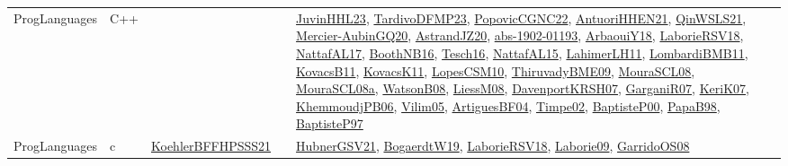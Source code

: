 {\begin{longtable}{lp{3cm}>{\raggedright}p{6cm}>{\raggedright}p{6cm}p{8cm}}
ProgLanguages &  C++  &  &  & \href{papers/JuvinHHL23.pdf}{JuvinHHL23}\cite{JuvinHHL23}, \href{papers/TardivoDFMP23.pdf}{TardivoDFMP23}\cite{TardivoDFMP23}, \href{papers/PopovicCGNC22.pdf}{PopovicCGNC22}\cite{PopovicCGNC22}, \href{papers/AntuoriHHEN21.pdf}{AntuoriHHEN21}\cite{AntuoriHHEN21}, \href{articles/QinWSLS21.pdf}{QinWSLS21}\cite{QinWSLS21}, \href{papers/Mercier-AubinGQ20.pdf}{Mercier-AubinGQ20}\cite{Mercier-AubinGQ20}, \href{articles/AstrandJZ20.pdf}{AstrandJZ20}\cite{AstrandJZ20}, \href{articles/abs-1902-01193.pdf}{abs-1902-01193}\cite{abs-1902-01193}, \href{papers/ArbaouiY18.pdf}{ArbaouiY18}\cite{ArbaouiY18}, \href{articles/LaborieRSV18.pdf}{LaborieRSV18}\cite{LaborieRSV18}, \href{articles/NattafAL17.pdf}{NattafAL17}\cite{NattafAL17}, \href{papers/BoothNB16.pdf}{BoothNB16}\cite{BoothNB16}, \href{papers/Tesch16.pdf}{Tesch16}\cite{Tesch16}, \href{articles/NattafAL15.pdf}{NattafAL15}\cite{NattafAL15}, \href{papers/LahimerLH11.pdf}{LahimerLH11}\cite{LahimerLH11}, \href{papers/LombardiBMB11.pdf}{LombardiBMB11}\cite{LombardiBMB11}, \href{articles/KovacsB11.pdf}{KovacsB11}\cite{KovacsB11}, \href{articles/KovacsK11.pdf}{KovacsK11}\cite{KovacsK11}, \href{articles/LopesCSM10.pdf}{LopesCSM10}\cite{LopesCSM10}, \href{papers/ThiruvadyBME09.pdf}{ThiruvadyBME09}\cite{ThiruvadyBME09}, \href{papers/MouraSCL08.pdf}{MouraSCL08}\cite{MouraSCL08}, \href{papers/MouraSCL08a.pdf}{MouraSCL08a}\cite{MouraSCL08a}, \href{papers/WatsonB08.pdf}{WatsonB08}\cite{WatsonB08}, \href{articles/LiessM08.pdf}{LiessM08}\cite{LiessM08}, \href{papers/DavenportKRSH07.pdf}{DavenportKRSH07}\cite{DavenportKRSH07}, \href{papers/GarganiR07.pdf}{GarganiR07}\cite{GarganiR07}, \href{papers/KeriK07.pdf}{KeriK07}\cite{KeriK07}, \href{papers/KhemmoudjPB06.pdf}{KhemmoudjPB06}\cite{KhemmoudjPB06}, \href{papers/Vilim05.pdf}{Vilim05}\cite{Vilim05}, \href{papers/ArtiguesBF04.pdf}{ArtiguesBF04}\cite{ArtiguesBF04}, \href{articles/Timpe02.pdf}{Timpe02}\cite{Timpe02}, \href{articles/BaptisteP00.pdf}{BaptisteP00}\cite{BaptisteP00}, \href{articles/PapaB98.pdf}{PapaB98}\cite{PapaB98}, \href{papers/BaptisteP97.pdf}{BaptisteP97}\cite{BaptisteP97}\\
ProgLanguages & c  & \href{articles/KoehlerBFFHPSSS21.pdf}{KoehlerBFFHPSSS21}\cite{KoehlerBFFHPSSS21} &  & \href{articles/HubnerGSV21.pdf}{HubnerGSV21}\cite{HubnerGSV21}, \href{papers/BogaerdtW19.pdf}{BogaerdtW19}\cite{BogaerdtW19}, \href{articles/LaborieRSV18.pdf}{LaborieRSV18}\cite{LaborieRSV18}, \href{papers/Laborie09.pdf}{Laborie09}\cite{Laborie09}, \href{articles/GarridoOS08.pdf}{GarridoOS08}\cite{GarridoOS08}\\

\end{longtable}}
